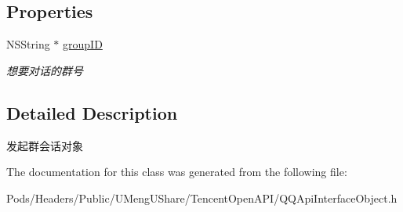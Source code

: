 \subsection*{Properties}
\begin{DoxyCompactItemize}
\item 
\mbox{\label{interface_q_q_api_group_chat_object_a02c804c041bd9803d1fc4ca15f8488e2}} 
N\+S\+String $\ast$ \mbox{\hyperlink{interface_q_q_api_group_chat_object_a02c804c041bd9803d1fc4ca15f8488e2}{group\+ID}}
\begin{DoxyCompactList}\small\item\em 想要对话的群号 \end{DoxyCompactList}\end{DoxyCompactItemize}


\subsection{Detailed Description}
发起群会话对象 

The documentation for this class was generated from the following file\+:\begin{DoxyCompactItemize}
\item 
Pods/\+Headers/\+Public/\+U\+Meng\+U\+Share/\+Tencent\+Open\+A\+P\+I/Q\+Q\+Api\+Interface\+Object.\+h\end{DoxyCompactItemize}
